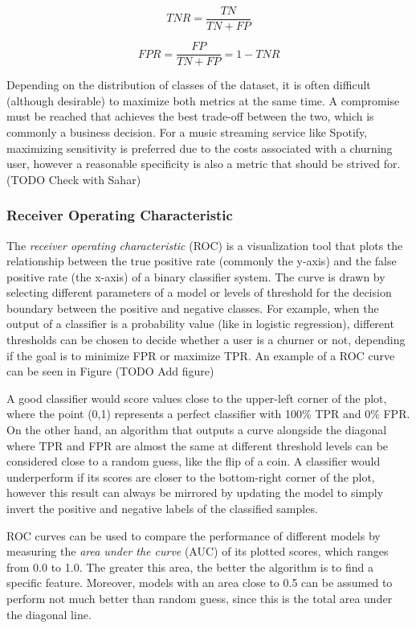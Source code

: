 \documentclass{kththesis}
\begin{document}
\begin{equation}
TNR = \frac{TN}{TN + FP}
\end{equation}

\begin{equation}
FPR = \frac{FP}{TN + FP} = 1 - TNR
\end{equation}

Depending on the distribution of classes of the dataset, it is often difficult (although desirable) to maximize both metrics at the same time. A compromise must be reached that achieves the best trade-off between the two, which is commonly a business decision. For a music streaming service like Spotify, maximizing sensitivity is preferred due to the costs associated with a churning user, however a reasonable specificity is also a metric that should be strived for. (TODO Check with Sahar)

\subsubsection{Receiver Operating Characteristic}

The \emph{receiver operating characteristic} (ROC) is a visualization tool that plots the relationship between the true positive rate (commonly the y-axis) and the false positive rate (the x-axis) of a binary classifier system. The curve is drawn by selecting different parameters of a model or levels of threshold for the decision boundary between the positive and negative classes. For example, when the output of a classifier is a probability value (like in logistic regression), different thresholds can be chosen to decide whether a user is a churner or not, depending if the goal is to minimize FPR or maximize TPR. An example of a ROC curve can be seen in Figure (TODO Add figure)

A good classifier would score values close to the upper-left corner of the plot, where the point (0,1) represents a perfect classifier with 100\% TPR and 0\% FPR. On the other hand, an algorithm that outputs a curve alongside the diagonal where TPR and FPR are almost the same at different threshold levels can be considered close to a random guess, like the flip of a coin. A classifier would underperform if its scores are closer to the bottom-right corner of the plot, however this result can always be mirrored by updating the model to simply invert the positive and negative labels of the classified samples.

ROC curves can be used to compare the performance of different models by measuring the \emph{area under the curve} (AUC) of its plotted scores, which ranges from 0.0 to 1.0. The greater this area, the better the algorithm is to find a specific feature. Moreover, models with an area close to 0.5 can be assumed to perform not much better than random guess, since this is the total area under the diagonal line.
\end{document}
